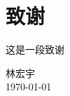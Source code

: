 
\chapter{致谢}

这是一段致谢

\vskip 108pt
\begin{flushright}
    林宏宇\makebox[1cm]{} \\
    \today
\end{flushright}
